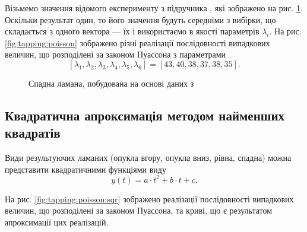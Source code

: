 Візьмемо значення відомого експерименту з підручника \cite{Ilin:2001}, які
зображено на рис. \ref{fig:tapping:Ilin01}.
Оскільки результат один, то його значення будуть середніми з вибірки, що
складається з одного вектора --- їх і використаємо в якості параметрів
$\lambda_i$.
На рис. \ref{fig:tapping:poisson} зображено різні реалізації послідовності
випадкових величин, що розподілені за законом Пуассона з параметрами
\begin{equation}\label{eq:tapping:poisson}
  \left[ \lambda_{1}, \lambda_{2}, \lambda_{3}, \lambda_{4}, \lambda_{5},
         \lambda_{6} \right]
  = \left[ 43, 40, 38, 37, 38, 35 \right].
\end{equation}

\begin{figure}[h]
  \centering
  \caption{Спадна ламана, побудована на основі даних з \cite{Ilin:2001}}
  \label{fig:tapping:Ilin01}
\end{figure}


\subsection{Квадратична апроксимація методом найменших квадратів}

Види результуючих ламаних (опукла вгору, опукла вниз, рівна, спадна) можна
представити квадратичними функціями виду
\begin{equation*}
  y\left( t \right) = a \cdot t^2 + b \cdot t + c.
\end{equation*}

На рис. \ref{fig:tapping:poisson:sqr} зображено реалізації послідовності
випадкових величин, що розподілені за законом Пуассона, та криві, що є
результатом апроксимації цих реалізацій.

